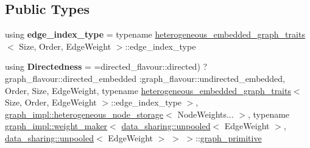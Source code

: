 \subsection*{Public Types}
\begin{DoxyCompactItemize}
\item 
\mbox{\label{classsequoia_1_1maths_1_1heterogeneous__embedded__static__graph_a6812afc783a76c00e181c95e97ce4079}} 
using {\bfseries edge\+\_\+index\+\_\+type} = typename \mbox{\hyperlink{structsequoia_1_1maths_1_1heterogeneous__embedded__graph__traits}{heterogeneous\+\_\+embedded\+\_\+graph\+\_\+traits}}$<$ Size, Order, Edge\+Weight $>$\+::edge\+\_\+index\+\_\+type
\item 
\mbox{\label{classsequoia_1_1maths_1_1heterogeneous__embedded__static__graph_a7d4d405c72e9c5134d275d548c87ed61}} 
using {\bfseries Directedness} = =directed\+\_\+flavour\+::directed) ? graph\+\_\+flavour\+::directed\+\_\+embedded \+:graph\+\_\+flavour\+::undirected\+\_\+embedded, Order, Size, Edge\+Weight, typename \mbox{\hyperlink{structsequoia_1_1maths_1_1heterogeneous__embedded__graph__traits}{heterogeneous\+\_\+embedded\+\_\+graph\+\_\+traits}}$<$ Size, Order, Edge\+Weight $>$\+::edge\+\_\+index\+\_\+type $>$, \mbox{\hyperlink{classsequoia_1_1maths_1_1graph__impl_1_1heterogeneous__node__storage}{graph\+\_\+impl\+::heterogeneous\+\_\+node\+\_\+storage}}$<$ Node\+Weights... $>$, typename \mbox{\hyperlink{classsequoia_1_1maths_1_1graph__impl_1_1weight__maker}{graph\+\_\+impl\+::weight\+\_\+maker}}$<$ \mbox{\hyperlink{classsequoia_1_1data__sharing_1_1unpooled}{data\+\_\+sharing\+::unpooled}}$<$ Edge\+Weight $>$, \mbox{\hyperlink{classsequoia_1_1data__sharing_1_1unpooled}{data\+\_\+sharing\+::unpooled}}$<$ Edge\+Weight $>$ $>$ $>$\+::\mbox{\hyperlink{classsequoia_1_1maths_1_1graph__primitive}{graph\+\_\+primitive}}
\end{DoxyCompactItemize}
